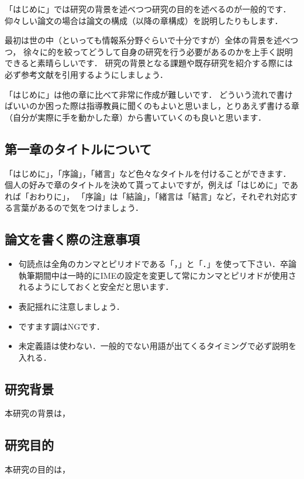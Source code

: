 「はじめに」では研究の背景を述べつつ研究の目的を述べるのが一般的です．
仰々しい論文の場合は論文の構成（以降の章構成）を説明したりもします．

最初は世の中（といっても情報系分野ぐらいで十分ですが）全体の背景を述べつつ，
徐々に的を絞ってどうして自身の研究を行う必要があるのかを上手く説明できると素晴らしいです．
研究の背景となる課題や既存研究を紹介する際には必ず参考文献を引用するようにしましょう．

「はじめに」は他の章に比べて非常に作成が難しいです．
どういう流れで書けばいいのか困った際は指導教員に聞くのもよいと思いまし，とりあえず書ける章（自分が実際に手を動かした章）から書いていくのも良いと思います．

\subsection{第一章のタイトルについて}
「はじめに」，「序論」，「緒言」など色々なタイトルを付けることができます．
個人の好みで章のタイトルを決めて貰ってよいですが，例えば「はじめに」であれば「おわりに」，
「序論」は「結論」，「緒言は「結言」など，それぞれ対応する言葉があるので気をつけましょう．

\subsection{論文を書く際の注意事項}
\begin{itemize}
    \item 句読点は全角のカンマとピリオドである「，」と「．」を使って下さい．卒論執筆期間中は一時的にIMEの設定を変更して常にカンマとピリオドが使用されるようにしておくと安全だと思います．
    \item 表記揺れに注意しましょう．
    \item ですます調はNGです．
    \item 未定義語は使わない．一般的でない用語が出てくるタイミングで必ず説明を入れる．
\end{itemize}

\subsection{研究背景}
本研究の背景は，

\subsection{研究目的}
本研究の目的は，